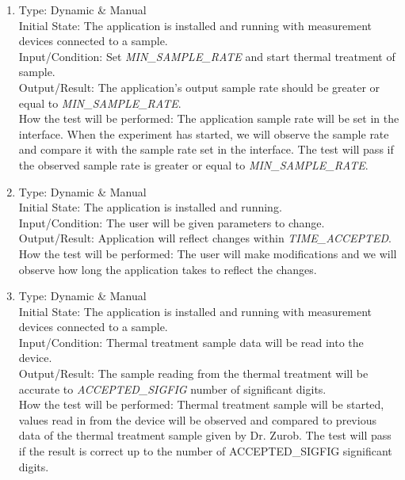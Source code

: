 \documentclass[12pt, titlepage]{article}
\begin{document}
\begin{adjustwidth}{2.2em}{0pt}
\begin{enumerate}[{NF-PT}1.]
  \item Type: Dynamic \& Manual \\ \label{PT1}
  Initial State: The application is installed and running with measurement devices connected to a sample.\\
  Input/Condition: Set \textsl{MIN\_SAMPLE\_RATE} and start thermal treatment of sample.\\
  Output/Result: The application's output sample rate should be greater or equal to \textsl{MIN\_SAMPLE\_RATE}.\\
  How the test will be performed: The application sample rate will be set in the interface. When the experiment has started, we will observe the sample rate and compare it with the sample rate set in the interface. The test will pass if the observed sample rate is greater or equal to \textsl{MIN\_SAMPLE\_RATE}.
  
  \item Type: Dynamic \& Manual\\ \label{PT2}
  Initial State: The application is installed and running.\\
  Input/Condition: The user will be given parameters to change.\\
  Output/Result: Application will reflect changes within \textsl{TIME\_ACCEPTED}.\\
  How the test will be performed: The user will make modifications and we will observe how long the application takes to reflect the changes. 

  \item Type: Dynamic \& Manual\\ \label{PT3}
  Initial State: The application is installed and running with measurement devices connected to a sample.\\
  Input/Condition: Thermal treatment sample data will be read into the device.\\
  Output/Result: The sample reading from the thermal treatment will be accurate to \textsl{ACCEPTED\_SIGFIG} number of significant digits.\\
  How the test will be performed: Thermal treatment sample will be started, values read in from the device will be observed and compared to previous data of the thermal treatment sample given by Dr. Zurob. The test will pass if the result is correct up to the number of {ACCEPTED\_SIGFIG} significant digits.


\end{enumerate}
\end{adjustwidth}
\end{document}
